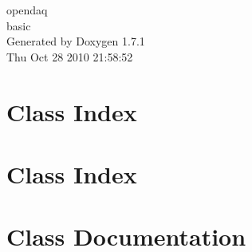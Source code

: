 \documentclass[a4paper]{book}
\begin{document}
\hypersetup{pageanchor=false}
\begin{titlepage}
\vspace*{7cm}
\begin{center}
{\Large opendaq \\[1ex]\large basic }\\
\vspace*{1cm}
{\large Generated by Doxygen 1.7.1}\\
\vspace*{0.5cm}
{\small Thu Oct 28 2010 21:58:52}\\
\end{center}
\end{titlepage}
\clearemptydoublepage
{}
\tableofcontents
\clearemptydoublepage
{}
\hypersetup{pageanchor=true}
\chapter{Class Index}

\chapter{Class Index}

\chapter{Class Documentation}
















\printindex
\end{document}
